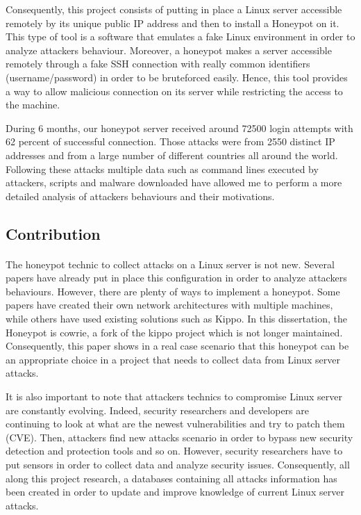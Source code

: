 Consequently, this project consists of putting in place a Linux server accessible remotely 
by its unique public IP address and then to install a Honeypot on it. This type of tool is
a software that emulates a fake Linux environment in order to analyze attackers behaviour.
Moreover, a honeypot makes a server accessible remotely through a fake SSH connection with
 really common identifiers (username/password) in order to be bruteforced easily.
Hence, this tool provides a way to allow malicious connection on its server while restricting
the access to the machine.

During 6 months, our honeypot server received around 72500 login attempts with 62 percent 
of successful connection. Those attacks were from 2550 distinct IP addresses and from a large
number of different countries all around the world. Following these attacks multiple data 
such as command lines executed by attackers, scripts and malware downloaded have allowed 
me to perform a more detailed analysis of attackers behaviours and their motivations.
 
\subsection{Contribution} %

\paragraph{}

The honeypot technic to collect attacks on a Linux server is not new. Several papers have
already put in place this configuration in order to analyze attackers behaviours. However, 
there are plenty of ways to implement a honeypot. Some papers have created their own network
 architectures with multiple machines, while others have used existing solutions such as Kippo.
In this dissertation, the Honeypot is cowrie, a fork of the kippo project which is not longer
maintained. Consequently, this paper shows in a real case scenario that this honeypot can be
 an appropriate choice in a project that needs to collect data from Linux server attacks.
 
It is also important to note that attackers technics to compromise Linux server are constantly 
evolving. Indeed, security researchers and developers are continuing to look at what are the 
newest vulnerabilities and try to patch them (CVE). Then, attackers find new attacks scenario
in order to bypass new security detection and protection tools and so on.
However, security researchers have to put sensors in order to collect data and analyze security
issues. Consequently, all along this project research, a databases containing all attacks information
has been created in order to update and improve knowledge of current Linux server attacks.

